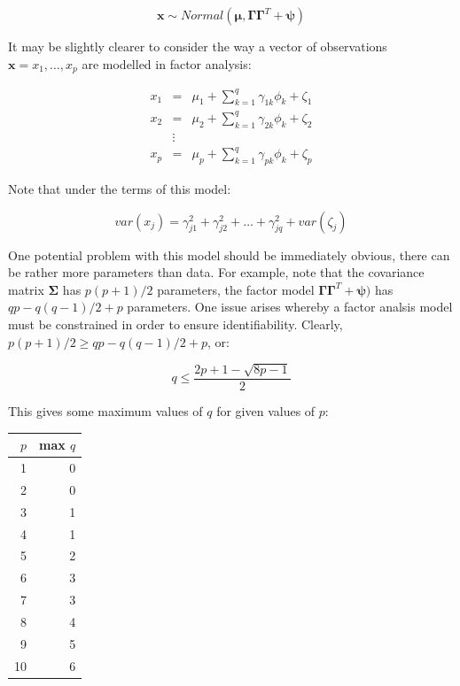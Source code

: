 \begin{displaymath}
\boldsymbol{x} \sim Normal(\boldsymbol{\mu}, \boldsymbol{\Gamma} \boldsymbol{\Gamma}^{T} + \boldsymbol{\psi})
\end{displaymath}

It may be slightly clearer to consider the way a vector of observations $\boldsymbol{x} = x_{1}, \ldots, x_{p}$ are modelled in factor analysis:

\begin{eqnarray*}
x_{1} &=& \mu_{1} + \sum_{k=1}^{q} \gamma_{1k} \phi_{k}  + \zeta_{1}\\
x_{2} &=& \mu_{2} + \sum_{k=1}^{q} \gamma_{2k} \phi_{k}  + \zeta_{2}\\
&\vdots&\\
x_{p} &=& \mu_{p} + \sum_{k=1}^{q} \gamma_{pk} \phi_{k}  + \zeta_{p}
\end{eqnarray*}

Note that under the terms of this model:

\begin{equation}
\label{communalities}
var(x_{j}) = \gamma_{j1}^{2} + \gamma_{j2}^{2} + \ldots + \gamma_{jq}^{2} + var(\zeta_{j})
\end{equation} 

One potential problem with this model should be immediately obvious, there can be rather more parameters than data.   For example, note that the covariance matrix $\boldsymbol{\Sigma}$ has $p(p+1)/2$ parameters, the factor model $ \boldsymbol{\Gamma} \boldsymbol{\Gamma}^{T} + \boldsymbol{\psi})$ has $qp - q(q-1)/2 + p$ parameters.  One issue arises whereby a factor analsis model must be constrained in order to ensure identifiability.  Clearly, $p(p+1)/2 \geq qp - q(q-1)/2 + p$, or:

\begin{equation}
\label{qp}
q \leq \frac{2p + 1 - \sqrt{8p-1}}{2}
\end{equation}

This gives some maximum values of $q$ for given values of $p$:


\begin{tabular}{rr}
\hline
$p$ & max $q$ \\
\hline
1 & 0\\
2 & 0\\ 
3 & 1\\
4 & 1\\
5 & 2\\
6 & 3\\
7 & 3\\
8 & 4\\
9 & 5\\
10 & 6\\
\hline
\end{tabular}

